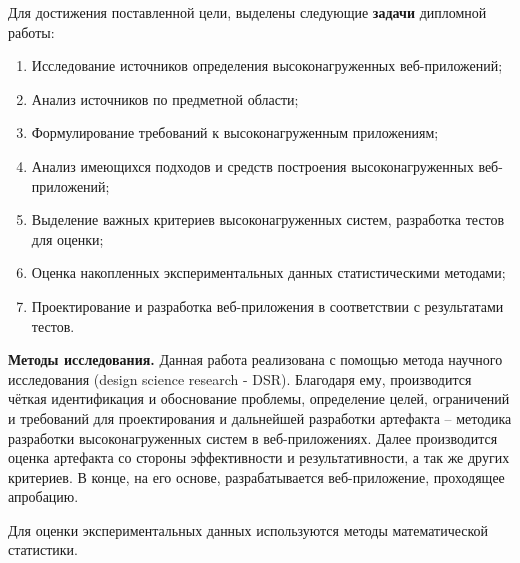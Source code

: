 Для достижения поставленной цели, выделены следующие \textbf{задачи} дипломной работы: 
\begin{enumerate}[1.]
	\item Исследование источников определения высоконагруженных веб-приложений;
	\item Анализ источников по предметной области;
	\item Формулирование требований к высоконагруженным приложениям;
	\item Анализ имеющихся подходов и средств построения высоконагруженных веб-приложений;
	\item Выделение важных критериев высоконагруженных систем, разработка тестов для оценки;
	\item Оценка накопленных экспериментальных данных статистическими методами;
	\item Проектирование и разработка веб-приложения в соответствии с результатами тестов.
\end{enumerate}

\textbf{Методы исследования.} Данная работа реализована с помощью метода научного исследования (design science research - DSR). Благодаря ему, производится чёткая идентификация и обоснование проблемы, определение целей, ограничений и требований для проектирования и дальнейшей разработки артефакта – методика разработки высоконагруженных систем в веб-приложениях. Далее производится оценка артефакта со стороны эффективности и результативности, а так же других критериев. В конце, на его основе, разрабатывается веб-приложение, проходящее апробацию.  

Для оценки экспериментальных данных используются методы математической статистики.